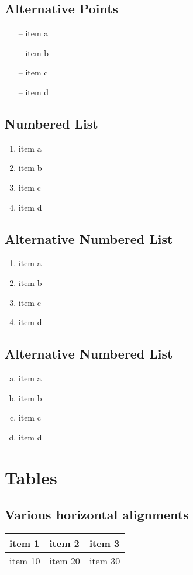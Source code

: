 \documentclass[12pt]{article}
\begin{document}
\subsection*{Alternative Points}
\begin{itemize}
\item[--] item a
\item[--] item b
\item[--] item c
\item[--] item d
\end{itemize}

\subsection*{Numbered List}
\begin{enumerate}
\item item a
\item item b
\item item c
\item item d
\end{enumerate}

\subsection*{Alternative Numbered List}
\begin{enumerate}[I]
\item item a
\item item b
\item item c
\item item d
\end{enumerate}

\subsection*{Alternative Numbered List}
\begin{enumerate}[a.]
\item item a
\item item b
\item item c
\item item d
\end{enumerate}

\pagebreak

\section{Tables}
\subsection{Various horizontal alignments}
\begin{tabularx}{0.8\textwidth} {
  | >{\raggedright\arraybackslash}X
  | >{\centering\arraybackslash}X
  | >{\raggedleft\arraybackslash}X | }
 \hline
 item 1 & item 2 & item 3 \\
 \hline
 item 10  & item 20  & item 30  \\
\hline
\end{tabularx}
\end{document}
